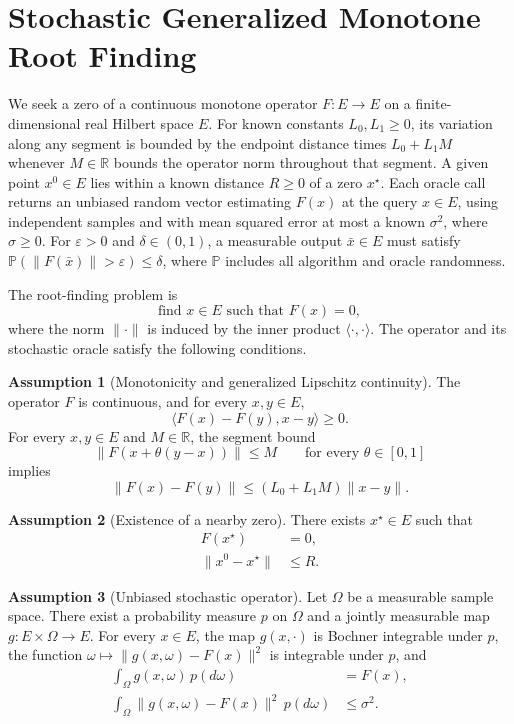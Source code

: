 \documentclass[10pt]{article}
\theoremstyle{definition}
\newtheorem{assumption}{Assumption}
\begin{document}
\section*{Stochastic Generalized Monotone Root Finding}
We seek a zero of a continuous monotone operator $F:E\to E$ on a finite-dimensional real Hilbert space $E$. For known constants $L_0,L_1\geq0$, its variation along any segment is bounded by the endpoint distance times $L_0+L_1M$ whenever $M\in\mathbb{R}$ bounds the operator norm throughout that segment. A given point $x^0\in E$ lies within a known distance $R\geq0$ of a zero $x^\star$. Each oracle call returns an unbiased random vector estimating $F(x)$ at the query $x\in E$, using independent samples and with mean squared error at most a known $\sigma^2$, where $\sigma\geq0$. For $\varepsilon>0$ and $\delta\in(0,1)$, a measurable output $\bar{x}\in E$ must satisfy $\mathbb{P}(\|F(\bar{x})\|>\varepsilon)\leq\delta$, where $\mathbb{P}$ includes all algorithm and oracle randomness.

The root-finding problem is
\[
\text{find }x\in E\text{ such that }F(x)=0,
\]
where the norm $\|\cdot\|$ is induced by the inner product $\langle\cdot,\cdot\rangle$. The operator and its stochastic oracle satisfy the following conditions.

\begin{assumption}[Monotonicity and generalized Lipschitz continuity]
The operator $F$ is continuous, and for every $x,y\in E$,
\[
\langle F(x)-F(y),x-y\rangle\geq0.
\]
For every $x,y\in E$ and $M\in\mathbb{R}$, the segment bound
\[
\|F(x+\theta(y-x))\|\leq M
\qquad\text{for every }\theta\in[0,1]
\]
implies
\[
\|F(x)-F(y)\|\leq(L_0+L_1M)\|x-y\|.
\]
\end{assumption}

\begin{assumption}[Existence of a nearby zero]
There exists $x^\star\in E$ such that
\[
\begin{aligned}
F(x^\star)&=0,\\
\|x^0-x^\star\|&\leq R.
\end{aligned}
\]
\end{assumption}

\begin{assumption}[Unbiased stochastic operator]
Let $\Omega$ be a measurable sample space. There exist a probability measure $p$ on $\Omega$ and a jointly measurable map $g:E\times\Omega\to E$. For every $x\in E$, the map $g(x,\cdot)$ is Bochner integrable under $p$, the function $\omega\mapsto\|g(x,\omega)-F(x)\|^2$ is integrable under $p$, and
\[
\begin{aligned}
\int_\Omega g(x,\omega)\,p(d\omega)&=F(x),\\
\int_\Omega\|g(x,\omega)-F(x)\|^2\,p(d\omega)&\leq\sigma^2.
\end{aligned}
\]
\end{assumption}
\end{document}
